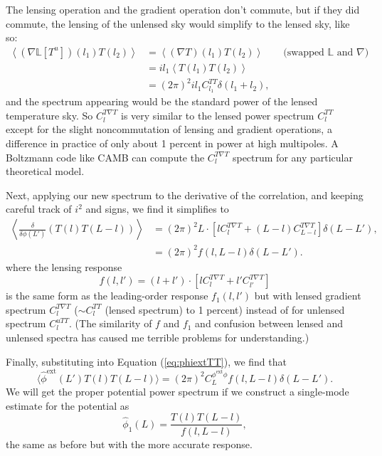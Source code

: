 The lensing operation and the gradient operation don't commute, but if they did commute, the lensing of the unlensed sky would simplify to the lensed sky, like so:
\begin{align}
  \left\langle (\nabla \mathbb{L}[T^u])(l_1) T(l_2) \right\rangle &=\left\langle (\nabla T)(l_1) T(l_2) \right\rangle \qquad \mbox{(swapped $\mathbb{L}$ and $\nabla$)} \nonumber
  \\ \nonumber
  &= il_1 \left\langle T(l_1) T(l_2) \right\rangle \\ 
  &= (2\pi)^2  il_1 C_{l_1}^{TT} \delta(l_1 + l_2),
\end{align}
and the spectrum appearing would be the standard power of the lensed temperature sky.  So $C_{l}^{T\nabla T}$ is very similar to the lensed power spectrum $C_l^{TT}$ except for the slight noncommutation of lensing and gradient operations, a difference in practice of only about 1 percent in power at high multipoles.  A Boltzmann code like CAMB can compute the $C_{l}^{T\nabla T}$ spectrum for any particular theoretical model.

Next, applying our new spectrum to the derivative of the correlation, and keeping careful track of $i^2$ and signs, we find it simplifies to 
\begin{align}
  \left\langle \frac{\delta}{\delta \phi(L')} \left(  T(l) T(L-l)  \right) \right\rangle &=  (2\pi)^2 L \cdot \left[  l C_{l}^{T\nabla T} + (L-l) C_{L-l}^{T\nabla T} \right] \delta(L-L'),  \\ \nonumber
  &=  (2\pi)^2 f(l,L-l) \delta(L-L').
\end{align}
where the lensing response
\begin{equation}
f(l,l') =  (l+l') \cdot \left[  l C_{l}^{T\nabla T} + l' C_{l'}^{T\nabla T} \right]
\end{equation}
is the same form as the leading-order response $f_1(l,l')$ but with lensed gradient spectrum $C_{l}^{T\nabla T}$ ($\sim C_l^{TT}$ (lensed spectrum) to 1 percent) instead of for unlensed spectrum $C_l^{uTT}$.  (The similarity of $f$ and $f_1$ and confusion between lensed and unlensed spectra has caused me terrible problems for understanding.)

Finally, substituting into Equation (\ref{eq:phiextTT}), we find that
\begin{equation}
  \langle \hat \phi^\textrm{ext}(L') T(l) T(L-l) \rangle =  (2\pi)^2 C_{L}^{\phi^\textrm{ext} \phi}  f(l,L-l) \delta(L-L').
\end{equation}
We will get the proper potential power spectrum if we construct a single-mode estimate for the potential as
\begin{equation}
  \hat \phi_1(L) = \frac{ T(l) T(L-l)}{ f(l,L-l)},
\end{equation}
the same as before but with the more accurate response.

